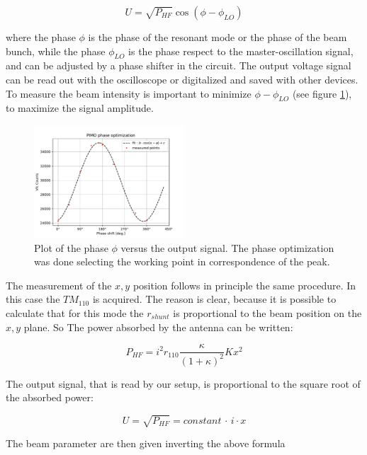 \begin{equation}
U = \sqrt{P_{HF}} \cos(\phi - \phi_{LO})
\end{equation}

where the phase $\phi$ is the phase of the resonant mode or the phase of the beam bunch, while the phase $\phi_{LO}$ is the phase respect to the master-oscillation signal, and can be adjusted by a phase shifter in the circuit. The output voltage signal can be read out with the oscilloscope or digitalized and saved with other devices. To measure the beam intensity is important to minimize $\phi - \phi_{LO}$ (see figure \ref{fig:PIMO}), to maximize the signal amplitude.

\begin{figure}[hbtp]
\centering
\includegraphics[width = 0.5\textwidth]{ExperimentalSetup/PIMOphase.pdf}
\caption{Plot of the phase $\phi$ versus the output signal. The phase optimization was done selecting the working point in correspondence of the peak.}
\label{fig:PIMO}
\end{figure}

The measurement of the $x,y$ position follows in principle the same procedure. In this case the $TM_{110}$ is acquired. The reason is clear, because it is possible to calculate that for this mode the $r_{shunt}$ is proportional to the beam position on the $x,y$ plane. So The power absorbed by the antenna can be written:

\begin{equation}
P_{HF} = i^{2} r_{110} \frac{\kappa}{(1 + \kappa)^{2}} K x^{2}
\end{equation} 
 
The output signal, that is read by our setup, is proportional to the square root of the absorbed power:

\begin{equation}
U = \sqrt{P_{HF}} = constant \, \cdot \, i   \cdot x
\end{equation} 

The beam parameter are then given inverting the above formula 

